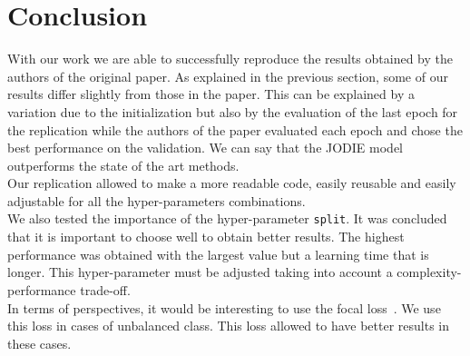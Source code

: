 \section*{Conclusion}
With our work we are able to successfully reproduce the results obtained by the authors of the original paper. As explained in the previous section, some of our results differ slightly from those in the paper. This can be explained by a variation due to the initialization but also by the evaluation of the last epoch for the replication while the authors of the paper evaluated each epoch and chose the best performance on the validation. We can say that the JODIE model outperforms the state of the art methods.\\
Our replication allowed to make a more readable code, easily reusable and easily adjustable for all the hyper-parameters combinations.\\
We also tested the importance of the hyper-parameter \texttt{split}. It was concluded that it is important to choose well to obtain better results. The highest performance was obtained with the largest value but a learning time that is longer. This hyper-parameter must be adjusted taking into account a complexity-performance trade-off.\\
In terms of perspectives, it would be interesting to use the focal loss~\cite{https://doi.org/10.48550/arxiv.1708.02002}. We use this loss in cases of unbalanced class. This loss allowed to have better results in these cases.